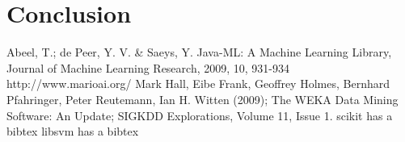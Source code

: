 \documentclass[]{article}   %
\begin{document}
\section{Conclusion}





\begin{thebibliography}{9}
  Abeel, T.; de Peer, Y. V. \& Saeys, Y. Java-ML: A Machine Learning Library, Journal of Machine Learning Research, 2009, 10, 931-934
  http://www.marioai.org/
  Mark Hall, Eibe Frank, Geoffrey Holmes, Bernhard Pfahringer, Peter Reutemann, Ian H. Witten (2009); The WEKA Data Mining Software: An Update; SIGKDD Explorations, Volume 11, Issue 1.
  scikit has a bibtex
  libsvm has a bibtex
\end{thebibliography}
\end{document}
